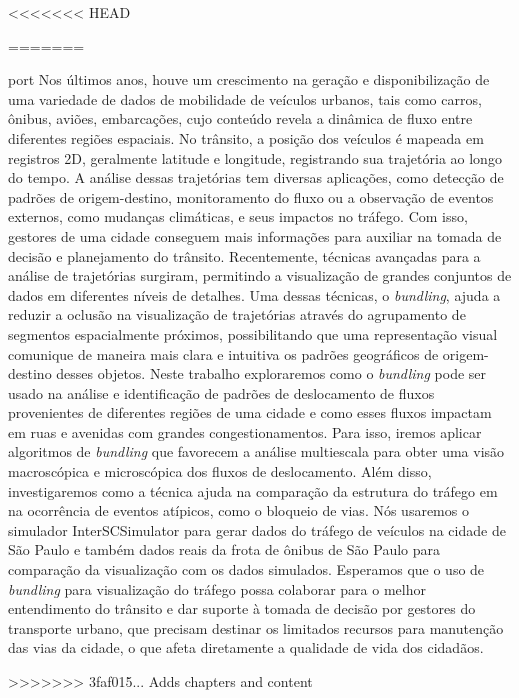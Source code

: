 <<<<<<< HEAD

=======
\begin{resumo}{port}
  Nos últimos anos, houve um crescimento na geração e disponibilização de uma
variedade de dados de mobilidade de veículos urbanos, tais como carros, ônibus, aviões, embarcações,
cujo conteúdo revela a dinâmica de fluxo entre diferentes regiões espaciais. No
trânsito, a posição dos veículos é mapeada em registros 2D, geralmente latitude
e longitude, registrando sua trajetória ao longo do tempo. A análise dessas
trajetórias tem diversas aplicações, como detecção de padrões de
origem-destino, monitoramento do fluxo ou a observação de eventos externos,
como mudanças climáticas, e seus impactos no tráfego. Com isso, gestores de uma
cidade conseguem mais informações para auxiliar na tomada de decisão e
planejamento do trânsito. Recentemente, técnicas avançadas para a análise de
trajetórias surgiram, permitindo a visualização de grandes conjuntos de dados
em diferentes níveis de detalhes. Uma dessas técnicas, o \emph{bundling},  ajuda a
reduzir a oclusão na visualização de trajetórias através do agrupamento de
segmentos espacialmente próximos, possibilitando que uma representação visual
comunique de maneira mais clara e intuitiva os padrões geográficos de
origem-destino desses objetos. Neste trabalho exploraremos como o \emph{bundling} pode
ser usado na análise e identificação de padrões de deslocamento de fluxos
provenientes de diferentes regiões de uma cidade e como esses fluxos impactam
em ruas e avenidas com grandes congestionamentos. Para isso, iremos aplicar
algoritmos de \emph{bundling} que favorecem a análise multiescala para obter uma
visão macroscópica e microscópica dos fluxos de deslocamento. Além disso,
investigaremos como a técnica ajuda na comparação da estrutura do tráfego em
na ocorrência de eventos atípicos, como o bloqueio de vias. Nós usaremos o simulador
InterSCSimulator para gerar dados do tráfego de veículos na
cidade de São Paulo e também dados reais da frota de ônibus de São Paulo para
comparação da visualização com os dados simulados. Esperamos que o uso de
\emph{bundling} para visualização do tráfego possa colaborar  para o melhor
entendimento do trânsito e dar suporte à tomada de decisão por gestores do
transporte urbano, que precisam destinar os limitados recursos para manutenção
das vias da cidade, o que afeta diretamente a qualidade de vida dos cidadãos.
\end{resumo}
>>>>>>> 3faf015... Adds chapters and content

